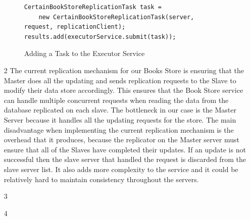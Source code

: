 \documentclass{article}      %
\begin{document}
\begin{itemize}
\begin{figure}[htbp]
\begin{center}
\begin{lstlisting}
CertainBookStoreReplicationTask task = 
	new CertainBookStoreReplicationTask(server, request, replicationClient);
results.add(executorService.submit(task));
\end{lstlisting}
\caption{Adding a Task to the Executor Service}
\label{Adding a Task to the Executor Service}
\end{center}
\end{figure}



\item[2] The current replication mechanism for our Books Store is ensuring that the Master does all the updating and sends replication requests to the Slave to modify their data store accordingly. This ensures that the Book Store service can handle multiple concurrent requests when reading the data from the database replicated on each slave. The bottleneck in our case is the Master Server because it handles all the updating requests for the store. The main disadvantage when implementing the current replication mechanism is the overhead that it produces, because the replicator on the Master server must ensure that all of the Slaves have completed their updates. If an update is not successful then the slave server that handled the request is discarded from the slave server list. It also adds more complexity to the service and it could be relatively hard to maintain consistency throughout the servers. \\

\item[3]
\item[4]

 

\end{itemize}
\end{document}
